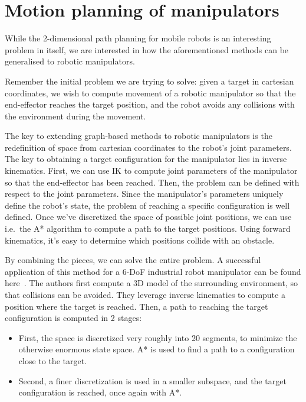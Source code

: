 \section{Motion planning of manipulators}

While the 2-dimensional path planning for mobile robots is an interesting problem in itself, we are interested in how the aforementioned methods can be generalised to robotic manipulators.

Remember the initial problem we are trying to solve: given a target in cartesian coordinates, we wish to compute movement of a robotic manipulator so that the end-effector reaches the target position, and the robot avoids any collisions with the environment during the movement.

The key to extending graph-based methods to robotic manipulators is the redefinition of space from cartesian coordinates to the robot's joint parameters. The key to obtaining a target configuration for the manipulator lies in inverse kinematics. First, we can use IK to compute joint parameters of the manipulator so that the end-effector has been reached. Then, the problem can be defined with respect to the joint parameters.
Since the manipulator's parameters uniquely define the robot's state, the problem of reaching a specific configuration is well defined. Once we've discretized the space of possible joint positions, we can use i.e.\ the A* algorithm to compute a path to the target positions. Using forward kinematics, it's easy to determine which positions collide with an obstacle.

By combining the pieces, we can solve the entire problem. A successful application of this method for a 6-DoF industrial robot manipulator can be found here~\cite{doubleA_star}. The authors first compute a 3D model of the surrounding environment, so that collisions can be avoided. They leverage inverse kinematics to compute a position where the target is reached. Then, a path to reaching the target configuration is computed in 2 stages:

\begin{itemize}
\item First, the space is discretized very roughly into 20 segments, to minimize the otherwise enormous state space. A* is used to find a path to a configuration close to the target.
\item Second, a finer discretization is used in a smaller subspace, and the target configuration is reached, once again with A*.
\end{itemize}

